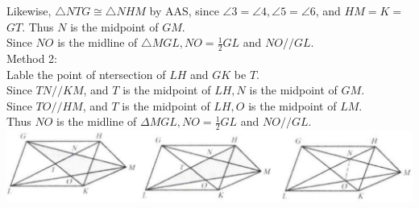 \documentclass{article}
\begin{document}
Likewise, \(\triangle N T G \cong \triangle N H M\) by AAS, since \(\angle 3=\angle 4, \angle 5=\angle 6\), and \(H M=K=\) \(G T\). Thus \(N\) is the midpoint of \(G M\).\\
Since \(N O\) is the midline of \(\triangle M G L, N O=\frac{1}{2} G L\) and \(N O / / G L\).\\
Method 2:\\
Lable the point of ntersection of \(L H\) and \(G K\) be \(T\).\\
Since \(T N / / K M\), and \(T\) is the midpoint of \(L H, N\) is the midpoint of \(G M\).\\
Since \(T O / / H M\), and \(T\) is the midpoint of \(L H, O\) is the midpoint of \(L M\).\\
Thus \(N O\) is the midline of \(\Delta M G L, N O=\frac{1}{2} G L\) and \(N O / / G L\).\\
\centering
\includegraphics[width=\textwidth]{images/049(1).jpg}
\end{document}
